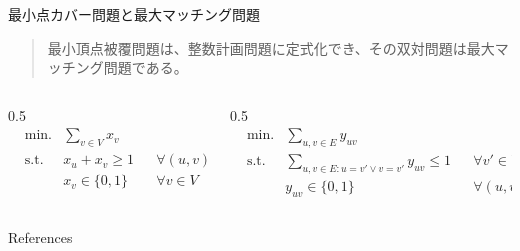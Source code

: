 \documentclass[aspectratio=169]{beamer}
\begin{document}
\begin{frame}{最小点カバー問題と最大マッチング問題}
	\begin{quote}
		最小頂点被覆問題は、整数計画問題に定式化でき、その双対問題は最大マッチング問題である。\cite{wikipedia2021}
	\end{quote}

	\begin{columns}[t]
		\begin{column}{0.5\textwidth}
			\begin{align*}
				 & \text{min.}  & \sum_{v \in V} x_v                           \\
				 & \text{s.t. } & x_u + x_v \ge 1    &  & \forall (u, v) \in E \\
				 &              & x_v \in \{0, 1\}   &  & \forall v \in V
			\end{align*}
		\end{column}
		\begin{column}{0.5\textwidth}
			\begin{align*}
				 & \text{min.}  & \sum_{u,v \in E} y_{uv}                                                   \\
				 & \text{s.t. } & \sum_{u,v \in E : u=v' \lor v=v' } y_{uv} \le 1 &  & \forall v' \in V     \\
				 &              & y_{uv} \in \{0, 1\}                             &  & \forall (u, v) \in E
			\end{align*}
		\end{column}
	\end{columns}
\end{frame}

\begin{frame}[allowframebreaks]{References}
	\printbibliography{}
\end{frame}
\end{document}
